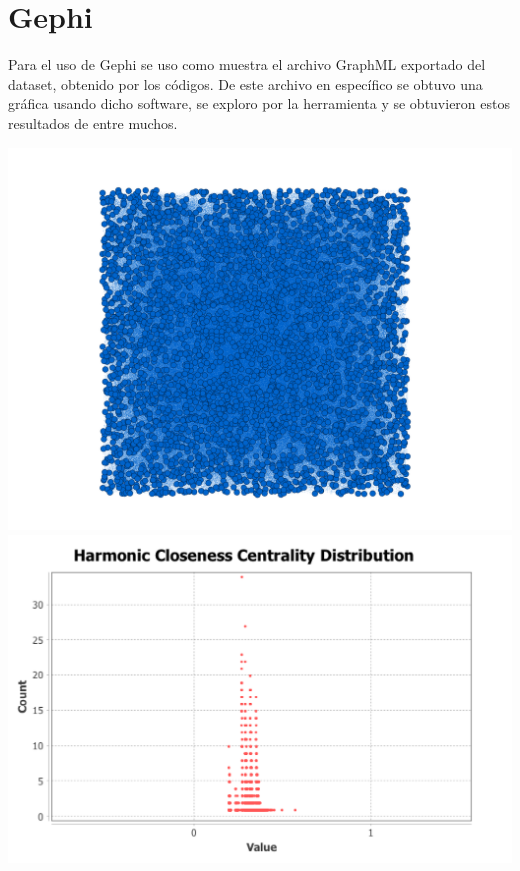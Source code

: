 \documentclass{article}
\begin{document}
\section{Gephi}
Para el uso de Gephi se uso como muestra el archivo GraphML exportado del dataset, obtenido por los códigos. De este archivo en específico se obtuvo una gráfica usando dicho software, se exploro por la herramienta y se obtuvieron estos resultados de entre muchos.

\begin{center}
\includegraphics[scale=.2]{Grafo.png}
\includegraphics[scale=.2]{HCCD.png}

\end{center}
\end{document}
